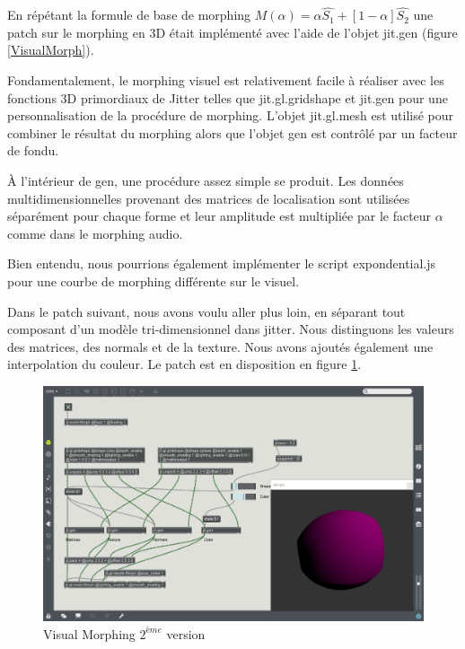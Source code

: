 En répétant la formule de base de morphing $M(\alpha) = \alpha\widehat {S_1} + [1 -\alpha]\widehat {S_2} $ une patch sur le morphing en 3D était implémenté avec l'aide de l'objet jit.gen (figure \ref{VisualMorph}).

Fondamentalement, le morphing visuel est relativement facile à réaliser avec les fonctions 3D primordiaux de Jitter telles que jit.gl.gridshape et jit.gen pour une personnalisation de la procédure de morphing. L'objet jit.gl.mesh est utilisé pour combiner le résultat du morphing alors que l'objet gen est contrôlé par un facteur de fondu.

À l'intérieur de gen, une procédure assez simple se produit. Les données multidimensionnelles provenant des matrices de localisation sont utilisées séparément pour chaque forme et leur amplitude est multipliée par le facteur $\alpha$ comme dans le morphing audio.

Bien entendu, nous pourrions également implémenter le script expondential.js pour une courbe de morphing différente sur le visuel.

Dans le patch suivant, nous avons voulu aller plus loin, en séparant tout composant d'un modèle tri-dimensionnel dans jitter. Nous distinguons les valeurs des matrices, des normals et de la texture. Nous avons ajoutés également une interpolation du couleur. Le patch est en disposition en figure \ref{VisualMorph2}.

    \begin{figure}
        \centering
        \includegraphics[width = \textwidth ]{Graphs/ShapeMorphing1.png}
        \caption{Visual Morphing $2^{ème}$ version}
        \label{VisualMorph2}
    \end{figure} 

